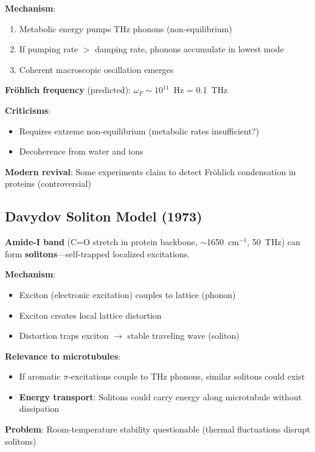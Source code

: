 \textbf{Mechanism}:
\begin{enumerate}
\item Metabolic energy pumps THz phonons (non-equilibrium)
\item If pumping rate $>$ damping rate, phonons accumulate in lowest mode
\item Coherent macroscopic oscillation emerges
\end{enumerate}

\textbf{Fröhlich frequency} (predicted): $\omega_F \sim 10^{11}$~Hz = 0.1~THz

\textbf{Criticisms}:
\begin{itemize}
\item Requires extreme non-equilibrium (metabolic rates insufficient?)
\item Decoherence from water and ions
\end{itemize}

\textbf{Modern revival}: Some experiments claim to detect Fröhlich condensation in proteins (controversial)

\subsection{Davydov Soliton Model (1973)}\label{davydov-soliton-model-1973}

\textbf{Amide-I band} (C=O stretch in protein backbone, $\sim$1650~cm$^{-1}$, 50~THz) can form \textbf{solitons}---self-trapped localized excitations.

\textbf{Mechanism}:
\begin{itemize}
\item Exciton (electronic excitation) couples to lattice (phonon)
\item Exciton creates local lattice distortion
\item Distortion traps exciton $\rightarrow$ stable traveling wave (soliton)
\end{itemize}

\textbf{Relevance to microtubules}:
\begin{itemize}
\item If aromatic $\pi$-excitations couple to THz phonons, similar solitons could exist
\item \textbf{Energy transport}: Solitons could carry energy along microtubule without dissipation
\end{itemize}

\textbf{Problem}: Room-temperature stability questionable (thermal fluctuations disrupt solitons)

